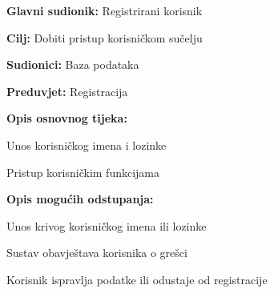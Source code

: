 					\noindent {}
					\begin{packed_item}
						
						\item \textbf{Glavni sudionik: } Registrirani korisnik
						\item  \textbf{Cilj:} Dobiti pristup korisničkom sučelju
						\item  \textbf{Sudionici:} Baza podataka
						\item  \textbf{Preduvjet:} Registracija
						\item  \textbf{Opis osnovnog tijeka:}
						
						\item[] \begin{packed_enum}
							
							\item Unos korisničkog imena i lozinke
							\item Pristup korisničkim funkcijama
						\end{packed_enum}
						
						\item  \textbf{Opis mogućih odstupanja:}
						
						\item[] \begin{packed_item}
							
							\item[1.a] Unos krivog korisničkog imena ili lozinke
							\item[] \begin{packed_enum}
								
								\item Sustav obavještava korisnika o grešci
								\item Korisnik ispravlja podatke ili odustaje od registracije
								
							\end{packed_enum}
							
						\end{packed_item}
					\end{packed_item}
			
